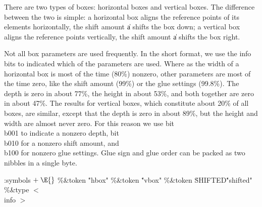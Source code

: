There are two types of boxes: horizontal boxes
and vertical boxes.
The difference between the two is simple:
a horizontal box aligns the reference
points of its elements horizontally, the shift amount \|a
shifts the box down;
a vertical box aligns the reference
points vertically,  the shift amount \|a shifts the box right.

Not all box parameters are used frequently. In the short format, we use the info bits
to indicated which of the parameters are used.
Where as the width of a horizontal box is most of the time (80\%) nonzero,
other parameters are most of the time zero,
like the shift amount (99\%) or the glue settings (99.8\%).
The depth is zero in about 77\%, the height in about 53\%,
and both together are zero in about 47\%. The results for vertical boxes,
which constitute about 20\% of all boxes, are similar,
except that the depth is zero in about 89\%,
but the height and width are almost never zero.
For this reason we use bit \\{b001} to indicate a nonzero depth,
bit \\{b010}  for a nonzero shift amount, and \\{b100} for nonzero glue settings.
Glue sign and glue order can be packed as two nibbles in a single byte.



\goodbreak
\readcode
\Y\par
\par
\par
\par
\par
\par
\par
\par
\par
\Y\B\4:symbols\X${}\mathrel+\E{}$\6
\8\%\&{token} \5\.{"hbox"}\6
\8\%\&{token} \5\.{"vbox"}\6
\8\%\&{token} \.{SHIFTED}\5\.{"shifted"}\6
\8\%\&{type} $<$ \\{info} $>$ \5
\5
\5
\Y
\fi


